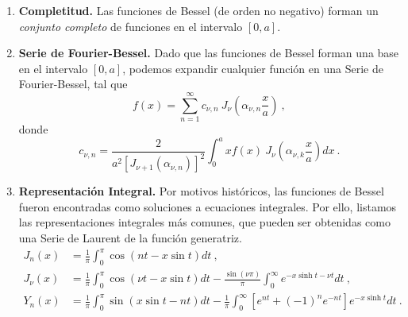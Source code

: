 \begin{propiedad}
\begin{enumerate}
        \item \textbf{Completitud.} Las funciones de Bessel (de orden no negativo) forman un \emph{conjunto completo} de funciones en el intervalo $[0,a]$.
        \item \textbf{Serie de Fourier-Bessel.} Dado que las funciones de Bessel forman una base en el intervalo $[0,a]$, podemos expandir cualquier función en una Serie de Fourier-Bessel, tal que
        \begin{equation}
            f(x) = \sum_{n=1}^\infty c_{\nu, n} \ J_\nu\left(\alpha_{\nu, n} \frac{x}{a}\right) \ ,
        \end{equation}
        donde
        \begin{equation}
            c_{\nu, n} = \frac{2}{a^2 \left[J_{\nu+1}(\alpha_{\nu, n})\right]^2} \int_0^a x f(x) \ J_\nu\left( \alpha_{\nu, k} \frac{x}{a} \right) dx \ .
        \end{equation}

        \item \textbf{Representación Integral.} Por motivos históricos, las funciones de Bessel fueron encontradas como soluciones a ecuaciones integrales. Por ello, listamos las representaciones integrales más comunes, que pueden ser obtenidas como una Serie de Laurent de la función generatriz.
        \begin{align}
            J_n(x) & = \frac{1}{\pi}\int_0^\pi \cos(nt - x\sin t) dt \ , \\
            J_\nu(x) & = \frac{1}{\pi} \int_0^\pi \cos(\nu t - x\sin t) dt - \frac{\sin(\nu \pi)}{\pi} \int_0^\infty e^{-x \sinh t - \nu t} dt \ , \\
            Y_n(x) & = \frac{1}{\pi} \int_0^\pi \sin(x\sin t - nt) dt - \frac{1}{\pi} \int_0^\infty \left[e^{nt} + (-1)^n e^{-nt} \right] e^{-x \sinh t} dt \ .
        \end{align}
    

\end{enumerate}
\end{propiedad}
